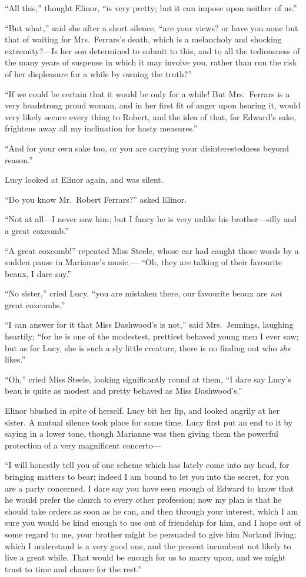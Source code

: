 \documentclass{article}
\begin{document}
``All this,'' thought Elinor, ``is very pretty;
but it can impose upon neither of us.''

``But what,'' said she after a short silence,
``are your views? or have you none but that of waiting for
Mrs.\ Ferrars's death, which is a melancholy and shocking
extremity?---Is her son determined to submit to this,
and to all the tediousness of the many years of suspense
in which it may involve you, rather than run the risk
of her displeasure for a while by owning the truth?''

``If we could be certain that it would be only
for a while!  But Mrs.\ Ferrars is a very headstrong
proud woman, and in her first fit of anger upon hearing
it, would very likely secure every thing to Robert,
and the idea of that, for Edward's sake, frightens away
all my inclination for hasty measures.''

``And for your own sake too, or you are carrying
your disinterestedness beyond reason.''

Lucy looked at Elinor again, and was silent.

``Do you know Mr.\ Robert Ferrars?'' asked Elinor.

``Not at all---I never saw him; but I fancy he
is very unlike his brother---silly and a great coxcomb.''

``A great coxcomb!'' repeated Miss Steele, whose ear had
caught those words by a sudden pause in Marianne's music.---%
``Oh, they are talking of their favourite beaux, I dare say.''

``No sister,'' cried Lucy, ``you are mistaken there, our
favourite beaux are \emph{not} great coxcombs.''

``I can answer for it that Miss Dashwood's is not,''
said Mrs.\ Jennings, laughing heartily; ``for he is one
of the modestest, prettiest behaved young men I ever saw;
but as for Lucy, she is such a sly little creature,
there is no finding out who \emph{she} likes.''

``Oh,'' cried Miss Steele, looking significantly round
at them, ``I dare say Lucy's beau is quite as modest
and pretty behaved as Miss Dashwood's.''

Elinor blushed in spite of herself.  Lucy bit her lip,
and looked angrily at her sister.  A mutual silence took
place for some time.  Lucy first put an end to it by saying
in a lower tone, though Marianne was then giving them
the powerful protection of a very magnificent concerto---%

``I will honestly tell you of one scheme which has
lately come into my head, for bringing matters to bear;
indeed I am bound to let you into the secret, for you
are a party concerned.  I dare say you have seen enough
of Edward to know that he would prefer the church to every
other profession; now my plan is that he should take
orders as soon as he can, and then through your interest,
which I am sure you would be kind enough to use out of
friendship for him, and I hope out of some regard to me,
your brother might be persuaded to give him Norland living;
which I understand is a very good one, and the present
incumbent not likely to live a great while.  That would
be enough for us to marry upon, and we might trust to time
and chance for the rest.''
\end{document}
